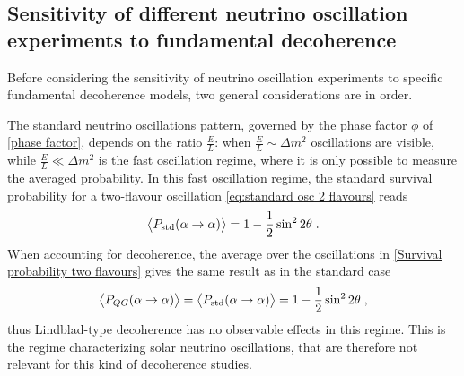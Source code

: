 \documentclass[11pt]{article}
\begin{document}
\subsection{Sensitivity of different neutrino oscillation experiments to fundamental decoherence}

Before considering the sensitivity of neutrino oscillation experiments to specific fundamental decoherence models, two general considerations are in order.

The standard neutrino oscillations pattern, governed by the phase factor $\phi$ of \eqref{phase factor}, depends on the ratio $\frac{E}{L}$: when $\frac{E}{L}\sim \Delta m^2$ oscillations are visible, while $\frac{E}{L}\ll \Delta m^2$ is the fast oscillation regime, where it is only possible to measure the averaged probability. In this fast oscillation regime, the standard survival probability for a two-flavour oscillation \eqref{eq:standard osc 2 flavours} reads  
\begin{equation}
    \expval{P_{\text{std}}(\alpha\to\alpha)} = 1-\frac{1}{2}\sin^2 2\theta\;.
\end{equation}
When accounting for decoherence, the average over the oscillations in \eqref{Survival probability two flavours} gives the same result as in the standard case
\begin{equation}\label{Average survival probability}
    \expval{ P_{QG}(\alpha\to\alpha)} = \expval{P_{\text{std}}(\alpha\to\alpha)} = 1-\frac{1}{2}\sin^2 2\theta\;,
\end{equation}
thus Lindblad-type decoherence has no observable effects in this regime.
This is the regime characterizing solar neutrino oscillations, that are therefore not relevant for this kind of decoherence studies.
\end{document}
